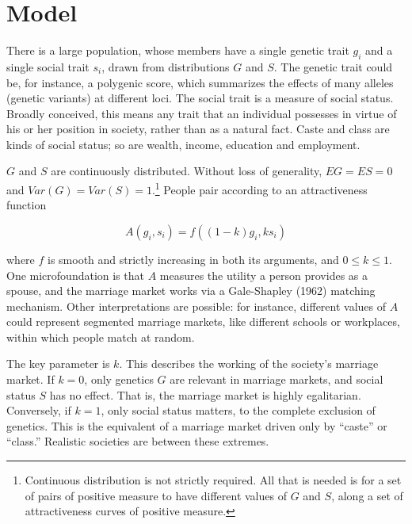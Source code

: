 \documentclass[
]{article}
\begin{document}
\hypertarget{model}{%
\section{Model}\label{model}}

There is a large population, whose members have a single genetic trait
\(g_{i}\) and a single social trait \(s_{i}\), drawn from distributions \(G\)
and \(S\). The genetic trait could be, for instance, a polygenic score,
which summarizes the effects of many alleles (genetic variants) at
different loci. The social trait is a measure of social status. Broadly
conceived, this means any trait that an individual possesses in virtue
of his or her position in society, rather than as a natural fact. Caste
and class are kinds of social status; so are wealth, income, education
and employment.

\(G\) and \(S\) are continuously distributed. Without loss of generality,
\(EG = ES = 0\) and \(Var(G) = Var(S) = 1\).\footnote{Continuous distribution is not strictly required. All that is
  needed is for a set of pairs of positive measure to have different
  values of \(G\) and \(S\), along a set of attractiveness curves of
  positive measure.} People pair according to an
attractiveness function

\[
A(g_{i},s_{i}) = f((1-k)g_{i},ks_{i})
\]

where \(f\) is smooth and strictly increasing in both its arguments, and
\(0 \le k \le 1\). One microfoundation is that \(A\) measures the utility a
person provides as a spouse, and the marriage market works via a
Gale-Shapley (1962) matching mechanism. Other
interpretations are possible: for instance, different values of \(A\)
could represent segmented marriage markets, like different schools or
workplaces, within which people match at random.

The key parameter is \(k\). This describes the working of the society's
marriage market. If \(k = 0\), only genetics \(G\) are relevant in marriage
markets, and social status \(S\) has no effect. That is, the marriage
market is highly egalitarian. Conversely, if \(k = 1\), only social status
matters, to the complete exclusion of genetics. This is the equivalent
of a marriage market driven only by ``caste'' or ``class.'' Realistic
societies are between these extremes.
\end{document}
